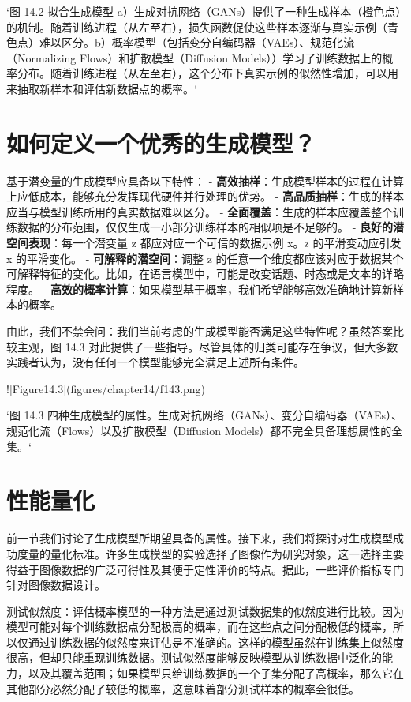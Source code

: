 `图 14.2 拟合生成模型 a）生成对抗网络（GANs）提供了一种生成样本（橙色点）的机制。随着训练进程（从左至右），损失函数促使这些样本逐渐与真实示例（青色点）难以区分。b）概率模型（包括变分自编码器（VAEs）、规范化流（Normalizing Flows）和扩散模型（Diffusion Models））学习了训练数据上的概率分布。随着训练进程（从左至右），这个分布下真实示例的似然性增加，可以用来抽取新样本和评估新数据点的概率。`

\section{如何定义一个优秀的生成模型？}
基于潜变量的生成模型应具备以下特性：
- \textbf{高效抽样}：生成模型样本的过程在计算上应低成本，能够充分发挥现代硬件并行处理的优势。
- \textbf{高品质抽样}：生成的样本应当与模型训练所用的真实数据难以区分。
- \textbf{全面覆盖}：生成的样本应覆盖整个训练数据的分布范围，仅仅生成一小部分训练样本的相似项是不足够的。
- \textbf{良好的潜空间表现}：每一个潜变量 z 都应对应一个可信的数据示例 x。z 的平滑变动应引发 x 的平滑变化。
- \textbf{可解释的潜空间}：调整 z 的任意一个维度都应该对应于数据某个可解释特征的变化。比如，在语言模型中，可能是改变话题、时态或是文本的详略程度。
- \textbf{高效的概率计算}：如果模型基于概率，我们希望能够高效准确地计算新样本的概率。

由此，我们不禁会问：我们当前考虑的生成模型能否满足这些特性呢？虽然答案比较主观，图 14.3 对此提供了一些指导。尽管具体的归类可能存在争议，但大多数实践者认为，没有任何一个模型能够完全满足上述所有条件。

![Figure14.3](figures/chapter14/f143.png)

`图 14.3 四种生成模型的属性。生成对抗网络（GANs）、变分自编码器（VAEs）、规范化流（Flows）以及扩散模型（Diffusion Models）都不完全具备理想属性的全集。`
\section{性能量化}
前一节我们讨论了生成模型所期望具备的属性。接下来，我们将探讨对生成模型成功度量的量化标准。许多生成模型的实验选择了图像作为研究对象，这一选择主要得益于图像数据的广泛可得性及其便于定性评价的特点。据此，一些评价指标专门针对图像数据设计。

测试似然度：评估概率模型的一种方法是通过测试数据集的似然度进行比较。因为模型可能对每个训练数据点分配极高的概率，而在这些点之间分配极低的概率，所以仅通过训练数据的似然度来评估是不准确的。这样的模型虽然在训练集上似然度很高，但却只能重现训练数据。测试似然度能够反映模型从训练数据中泛化的能力，以及其覆盖范围；如果模型只给训练数据的一个子集分配了高概率，那么它在其他部分必然分配了较低的概率，这意味着部分测试样本的概率会很低。


